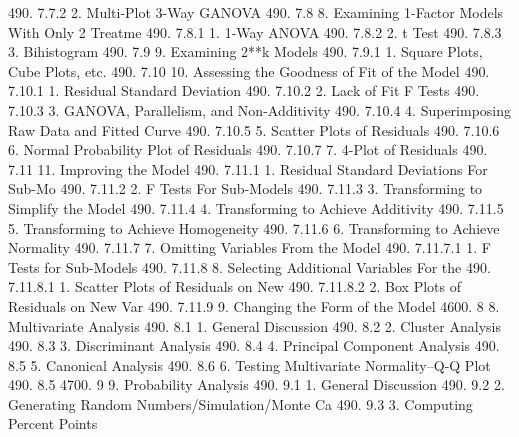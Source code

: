 490.      7.7.2                       2. Multi-Plot 3-Way GANOVA
490.      7.8                   8. Examining 1-Factor Models With Only 2 Treatme
490.      7.8.1                       1. 1-Way ANOVA
490.      7.8.2                       2. t Test
490.      7.8.3                       3. Bihistogram
490.      7.9                   9. Examining 2**k Models
490.      7.9.1                       1. Square Plots, Cube Plots, etc.
490.      7.10                 10. Assessing the Goodness of Fit of the Model
490.      7.10.1                      1. Residual Standard Deviation
490.      7.10.2                      2. Lack of Fit F Tests
490.      7.10.3                      3. GANOVA, Parallelism, and Non-Additivity
490.      7.10.4                      4. Superimposing Raw Data and Fitted Curve
490.      7.10.5                      5. Scatter Plots of Residuals
490.      7.10.6                      6. Normal Probability Plot of Residuals
490.      7.10.7                      7. 4-Plot of Residuals
490.      7.11                 11. Improving the Model
490.      7.11.1                      1. Residual Standard Deviations For Sub-Mo
490.      7.11.2                      2. F Tests For Sub-Models
490.      7.11.3                      3. Transforming to Simplify the Model
490.      7.11.4                      4. Transforming to Achieve Additivity
490.      7.11.5                      5. Transforming to Achieve Homogeneity
490.      7.11.6                      6. Transforming to Achieve Normality
490.      7.11.7                      7. Omitting Variables From the Model
490.      7.11.7.1                          1. F Tests for Sub-Models
490.      7.11.8                      8. Selecting Additional Variables For the
490.      7.11.8.1                          1. Scatter Plots of Residuals on New
490.      7.11.8.2                          2. Box Plots of Residuals on New Var
490.      7.11.9                      9. Changing the Form of the Model
4600.     8               8. Multivariate Analysis
490.      8.1                   1. General Discussion
490.      8.2                   2. Cluster Analysis
490.      8.3                   3. Discriminant Analysis
490.      8.4                   4. Principal Component Analysis
490.      8.5                   5. Canonical Analysis
490.      8.6                   6. Testing Multivariate Normality--Q-Q Plot
490.      8.5
4700.     9               9. Probability Analysis
490.      9.1                   1. General Discussion
490.      9.2                   2. Generating Random Numbers/Simulation/Monte Ca
490.      9.3                   3. Computing Percent Points
